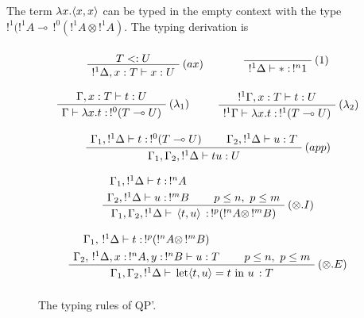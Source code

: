 \begin{exmp} The term $\lambda x.\langle x, x \rangle$ can be typed in the empty context with the type 
	$!^1(!^1 A \multimap \,!^0(!^1A \otimes !^1A)$. The typing derivation is
		\begin{prooftree}
		\end{prooftree}
\end{exmp}

\begin{figure}[!ht]
\begin{mdframed}
	$$ $$
	$$ \mbox{
		\AxiomC{$T <: U$}
		\RightLabel{$(ax)$}
		\UnaryInfC{$!^1 \Delta, x : T \vdash x : U$}
		\DisplayProof
		~~
		~~
		~~
		\AxiomC{}
		\RightLabel{$(1)$}
		\UnaryInfC{$!^1 \Delta \vdash * : \,!^n 1$}
		\DisplayProof
	} $$
	$$ $$
	$$ \mbox{
		\AxiomC{$\Gamma, x : T \vdash t : U$}
		\RightLabel{$(\lambda_1)$}
		\UnaryInfC{$\Gamma \vdash \lambda x.t : \,!^0 (T \multimap U)$}
		\DisplayProof
		~~
		~~
		\AxiomC{$!^1 \Gamma, x : T \vdash t : U$}
		\RightLabel{$(\lambda_2)$}
		\UnaryInfC{$!^1 \Gamma \vdash \lambda x.t : \,!^1 (T \multimap U)$}
		\DisplayProof
	} $$
	$$ $$
	$$ \mbox{
		\AxiomC{$\Gamma_1, !^1\Delta \vdash t : \,!^0(T \multimap U)$}
		\AxiomC{$\Gamma_2, !^1\Delta \vdash u : T$}
		\RightLabel{$(app)$}
		\BinaryInfC{$\Gamma_1, \Gamma_2, !^1\Delta \vdash t u : U$}
		\DisplayProof
	} $$
	$$ $$
	$$ \mbox{
		\AxiomC{$\Gamma_1, !^1\Delta \vdash t : \, !^nA$}
		\noLine
		\UnaryInfC{$\Gamma_2, !^1\Delta \vdash u : \, !^mB$}
		\AxiomC{$p \le n, ~ p \le m$}
		\RightLabel{$(\otimes.I)$}
		\BinaryInfC{$\Gamma_1, \Gamma_2, !^1\Delta \vdash \, \pair{t}{u} \, : \,!^p(!^nA \otimes \,!^mB)$}
		\DisplayProof
	} $$
	$$ $$
	$$ \mbox{
		\AxiomC{$\Gamma_1, \,!^1\Delta \vdash t : \, !^p (!^nA \otimes \,!^mB)$}
		\noLine
		\UnaryInfC{$\Gamma_2, \,!^1\Delta, x : \,!^nA, y : \,!^nB \vdash u : T$}
		\AxiomC{$p \le n, ~ p \le m$}
		\RightLabel{$(\otimes.E)$}
		\BinaryInfC{$\Gamma_1, \Gamma_2, !^1\Delta \vdash \, \text{let} \pair{t}{u} = t ~ \text{in} ~ u \, : T$}
		\DisplayProof
	} $$
	$$ $$
\end{mdframed}
\caption{The typing rules of QP'.}
\label{typingQP'}
\end{figure}


